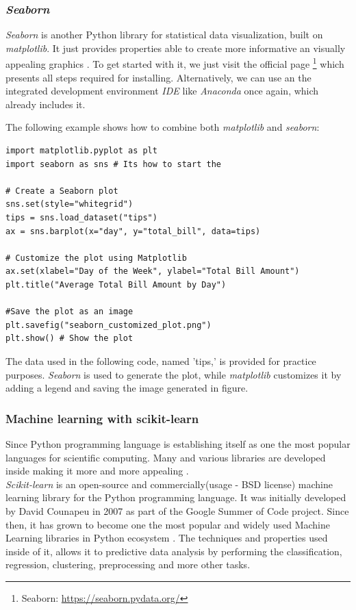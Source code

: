 \documentclass[12pt,a4paper, oneside]{book}
\begin{document}
\subsubsection*{\textit{Seaborn}}
\textit{Seaborn} is another Python library for statistical data visualization, built on \textit{matplotlib}. It just provides properties able to create more informative an visually appealing graphics \cite{sial2021comparative}. To get started with it, we just visit the official page \footnote{Seaborn: \url{https://seaborn.pydata.org/}} which presents all steps required for installing. Alternatively, we can use an  the integrated development environment \textit{IDE} like \textit{Anaconda} once again, which already includes it. 

The following example shows how to combine both \textit{matplotlib} and \textit{seaborn}:  
\begin{lstlisting}[style=stylejupyter]
import matplotlib.pyplot as plt 
import seaborn as sns # Its how to start the 

# Create a Seaborn plot
sns.set(style="whitegrid")
tips = sns.load_dataset("tips")
ax = sns.barplot(x="day", y="total_bill", data=tips)

# Customize the plot using Matplotlib
ax.set(xlabel="Day of the Week", ylabel="Total Bill Amount")
plt.title("Average Total Bill Amount by Day")

#Save the plot as an image
plt.savefig("seaborn_customized_plot.png")
plt.show() # Show the plot
\end{lstlisting} 
The data used in the following code, named 'tips,' is provided for practice purposes. \textit{Seaborn} is used to generate the plot, while \textit{matplotlib} customizes it by adding a legend and saving the image generated in figure.


\subsubsection*{\large Machine learning with scikit-learn} 
Since Python programming language is establishing itself as one the most popular languages for scientific computing. Many and various libraries are developed inside making it more and more appealing \cite{pedregosa2011scikit}. \\

\textit{Scikit-learn} is an open-source and commercially(usage - BSD license) machine learning library for the Python programming language. It was initially developed by David Counapeu in 2007 as part of the Google Summer of Code project. Since then, it has grown to become one the most popular and widely used Machine Learning libraries in Python ecosystem \cite{scikitlearnCode1}.   
The techniques and properties used inside of it, allows it to predictive data analysis by performing the  classification, regression, clustering, preprocessing and more other tasks.\\
\end{document}
